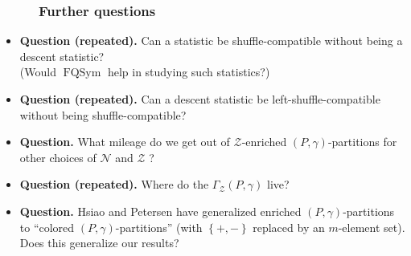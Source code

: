 \documentclass{beamer}
\newcommand{\calN}{\mathcal{N}}
\newcommand{\calZ}{\mathcal{Z}}
\newcommand{\fti}[1]{\frametitle{\ \ \ \ \ #1}}
\newcommand{\set}[1]{\left\{ #1 \right\}}
\newcommand{\tup}[1]{\left( #1 \right)}
\theoremstyle{plain}
\begin{document}
\begin{frame}
\fti{Further questions}

\begin{itemize}

\item \textbf{Question (repeated).}
      Can a statistic be shuffle-compatible without being
      a descent statistic? \\
      (Would $\operatorname{FQSym}$ help in studying such
      statistics?)

\item \textbf{Question (repeated).}
      Can a descent statistic be left-shuffle-compatible without
      being shuffle-compatible?

\item \textbf{Question.}
      What mileage do we get out of $\calZ$-enriched
      $\tup{P,\gamma}$-partitions for other choices of
      $\calN$ and $\calZ$ ?

\item \textbf{Question (repeated).}
      Where do the $\Gamma_{\calZ}\tup{P,\gamma}$ live?

\item \textbf{Question.}
      Hsiao and Petersen have generalized enriched
      $\tup{P, \gamma}$-partitions to ``colored
      $\tup{P, \gamma}$-partitions'' (with $\set{+,-}$
      replaced by an $m$-element set).
      Does this generalize our results?

\end{itemize}

\end{frame}





      

      

      

      

      


\end{document}

